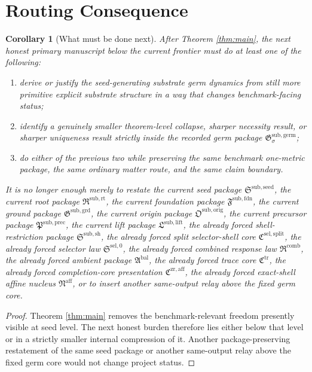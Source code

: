 \documentclass[11pt]{article}
\newcommand{\FoundationPackage}{\mathfrak F^{\mathrm{sub,fdn}}}
\newcommand{\GroundPackage}{\mathfrak G^{\mathrm{sub,grd}}}
\newcommand{\OriginPackage}{\mathfrak O^{\mathrm{sub,orig}}}
\newcommand{\PrecursorPackage}{\mathfrak P^{\mathrm{sub,prec}}}
\newcommand{\LiftPackage}{\mathfrak L^{\mathrm{sub,lift}}}
\newcommand{\ShellRestriction}{\mathfrak S^{\mathrm{sub,sh}}}
\newcommand{\SelectorCore}{\mathfrak C^{\mathrm{sel,split}}}
\newcommand{\SelectorLaw}{\mathfrak S^{\mathrm{sel},0}}
\newcommand{\CombinedLaw}{\mathfrak R^{\mathrm{comb}}}
\newcommand{\AmbientPackage}{\mathfrak A^{\mathrm{bal}}}
\newcommand{\TraceCore}{\mathfrak C^{\mathrm{tr}}}
\newcommand{\CompletionCore}{\mathfrak C^{\mathrm{zr,aff}}}
\newcommand{\AffineNucleus}{\mathfrak N^{\mathrm{aff}}}
\newcommand{\RootPackage}{\mathfrak R^{\mathrm{sub,rt}}}
\newcommand{\SeedPackage}{\mathfrak S^{\mathrm{sub,seed}}}
\newcommand{\GermPackage}{\mathfrak G^{\mathrm{sub,germ}}}
\newtheorem{corollary}{Corollary}
\begin{document}
\section{Routing Consequence}

\begin{corollary}[What must be done next]
\label{cor:next}
After Theorem \ref{thm:main}, the next honest primary manuscript below the current frontier must do at least one of the following:
\begin{enumerate}
    \item derive or justify the seed-generating substrate germ dynamics from still more primitive explicit substrate structure in a way that changes benchmark-facing status;
    \item identify a genuinely smaller theorem-level collapse, sharper necessity result, or sharper uniqueness result strictly inside the recorded germ package \(\GermPackage_{\sigma}\);
    \item do either of the previous two while preserving the same benchmark one-metric package, the same ordinary matter route, and the same claim boundary.
\end{enumerate}
It is no longer enough merely to restate the current seed package \(\SeedPackage\), the current root package \(\RootPackage\), the current foundation package \(\FoundationPackage\), the current ground package \(\GroundPackage\), the current origin package \(\OriginPackage\), the current precursor package \(\PrecursorPackage\), the current lift package \(\LiftPackage\), the already forced shell-restriction package \(\ShellRestriction\), the already forced split selector-shell core \(\SelectorCore\), the already forced selector law \(\SelectorLaw\), the already forced combined response law \(\CombinedLaw\), the already forced ambient package \(\AmbientPackage\), the already forced trace core \(\TraceCore\), the already forced completion-core presentation \(\CompletionCore\), the already forced exact-shell affine nucleus \(\AffineNucleus\), or to insert another same-output relay above the fixed germ core.
\end{corollary}

\begin{proof}
Theorem \ref{thm:main} removes the benchmark-relevant freedom presently visible at seed level. The next honest burden therefore lies either below that level or in a strictly smaller internal compression of it. Another package-preserving restatement of the same seed package or another same-output relay above the fixed germ core would not change project status.
\end{proof}
\end{document}
